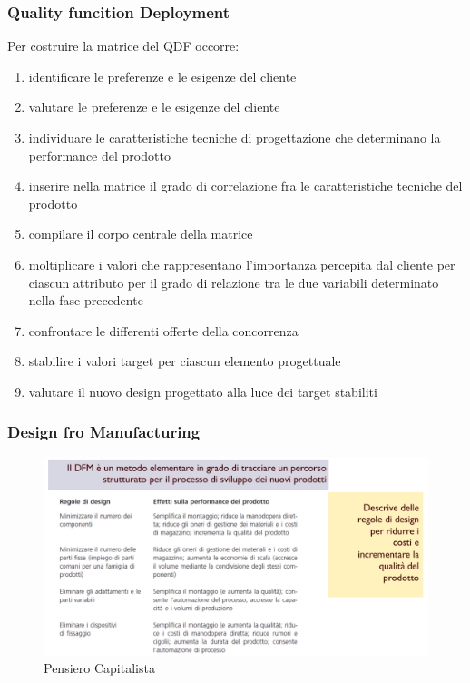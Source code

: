 \documentclass{article}
\begin{document}
\subsubsection{Quality funcition Deployment}

Per costruire la matrice del QDF occorre:
\begin{enumerate}
	\item identificare le preferenze e le esigenze del cliente
	\item valutare le preferenze e le esigenze del cliente
	\item individuare le caratteristiche tecniche di progettazione che
	determinano la performance del prodotto
	\item inserire nella matrice il grado di correlazione fra le
	caratteristiche tecniche del prodotto
	\item compilare il corpo centrale della matrice
	\item	moltiplicare i valori che rappresentano l’importanza
	percepita dal cliente per ciascun attributo per il grado di
	relazione tra le due variabili determinato nella fase
	precedente
	\item	confrontare le differenti offerte della concorrenza
	\item	stabilire i valori target per ciascun elemento progettuale
	\item	valutare il nuovo design progettato alla luce dei target stabiliti
\end{enumerate}

\subsubsection{Design fro Manufacturing}
\begin{figure}[h!]
	\centering
	\includegraphics[scale=0.4]{images/DFM.png}
	\caption{Pensiero Capitalista}
	\label{fig:DFN}
\end{figure}
\end{document}
